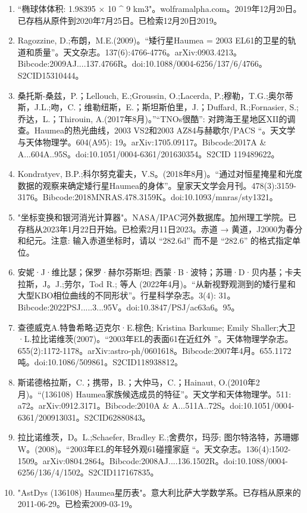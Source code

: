 \begin{enumerate}
\item “椭球体体积: 1.98395 × 10 ^ 9 km3"。wolframalpha.com。2019年12月20日。已存档从原件到2020年7月25日。已检索12月20日2019。
\item Ragozzine, D.;布朗，M.E.(2009)。“矮行星Haumea = 2003 EL61的卫星的轨道和质量”。天文杂志。137(6):4766-4776。arXiv:0903.4213。Bibcode:2009AJ....137.4766R。doi:10.1088/0004-6256/137/6/4766。S2CID15310444。  
\item 桑托斯-桑兹，P.；Lellouch, E.;Groussin, O.;Lacerda, P.;穆勒，T.G.;奥尔蒂斯，J.L.;吻，C.；维勒纽斯，E.；斯坦斯伯里，J.；Duffard, R.;Fornasier, S.;乔达，L.；Thirouin, A.(2017年8月)。”“TNOs很酷”: 对跨海王星地区XII的调查。Haumea的热光曲线，2003 VS2和2003 AZ84与赫歇尔/PACS “。天文学与天体物理学。604(A95): 19。arXiv:1705.09117。Bibcode:2017A & A...604A..95S。doi:10.1051/0004-6361/201630354。S2CID 119489622。
\item Kondratyev, B.P.;科尔努克霍夫，V.S。(2018年8月)。“通过对恒星掩星和光度数据的观察来确定矮行星Haumea的身体”。皇家天文学会月刊。478(3):3159-3176。Bibcode:2018MNRAS.478.3159K。doi:10.1093/mnras/sty1321。
\item "坐标变换和银河消光计算器"。NASA/IPAC河外数据库。加州理工学院。已存档从2023年1月22日开始。已检索2月11日2023。赤道 → 黄道，J2000为春分和纪元。注意: 输入赤道坐标时，请以 “282.6d” 而不是 “282.6” 的格式指定单位。
\item 安妮·J·维比瑟；保罗·赫尔芬斯坦; 西蒙·B·波特；苏珊·D·贝内基；卡夫拉斯，J。J.;劳尔，Tod R.; 等人 (2022年4月)。“从新视野观测到的矮行星和大型KBO相位曲线的不同形状”。行星科学杂志。3(4): 31。Bibcode:2022PSJ.....3...95V。doi:10.3847/PSJ/ac63a6。95。
\item 查德威克A.特鲁希略;迈克尔·E.棕色; Kristina Barkume; Emily Shaller;大卫·L.拉比诺维茨(2007)。“2003年EL的表面61在近红外 ”。天体物理学杂志。655(2):1172-1178。arXiv:astro-ph/0601618。Bibcode:2007年4月。655.1172吨。doi:10.1086/509861。S2CID118938812。  
\item 斯诺德格拉斯，C.；携带，B.；大仲马，C.；Hainaut, O.(2010年2月)。“(136108) Haumea家族候选成员的特征”。天文学和天体物理学。511: a72。arXiv:0912.3171。Bibcode:2010A & A...511A..72S。doi:10.1051/0004-6361/200913031。S2CID62880843。  
\item 拉比诺维茨，D。L.;Schaefer, Bradley E.;舍费尔，玛莎; 图尔特洛特，苏珊娜W。(2008)。“2003年EL的年轻外观61碰撞家庭 “。天文杂志。136(4):1502-1509。arXiv:0804.2864。Bibcode:2008AJ....136.1502R。doi:10.1088/0004-6256/136/4/1502。S2CID117167835。  
\item "AstDys (136108) Haumea星历表"。意大利比萨大学数学系。已存档从原来的2011-06-29。已检索2009-03-19。

\end{enumerate}
